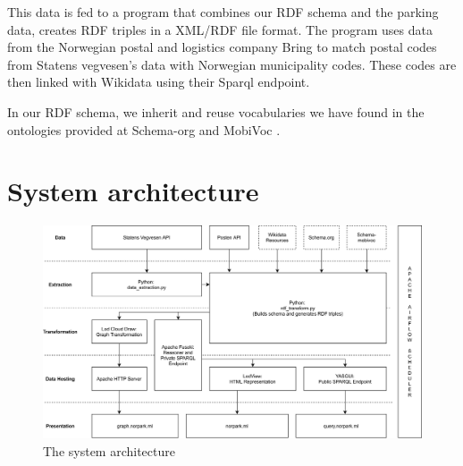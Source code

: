 \vspace{5mm}

This data is fed to a program that combines our RDF schema and the parking data, creates RDF triples in a XML/RDF file format. The program uses data from the Norwegian postal and logistics company Bring \cite{bring} to match postal codes from Statens vegvesen's data with Norwegian municipality codes. These codes are then linked with Wikidata \cite{wikidata} using their Sparql endpoint.

\vspace{5mm}

In our RDF schema, we inherit and reuse vocabularies we have found in the ontologies provided at Schema-org \cite{schema-org} and MobiVoc \cite{schema-mobivoc}.


\section{System architecture}

\begin{figure}[H]
	\centering
	\includegraphics[width=\linewidth]{figures/system-architecture.png}
	\caption{The system architecture}
\end{figure}




